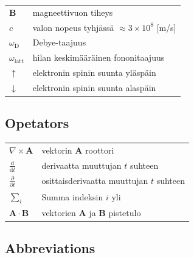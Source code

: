 \documentclass[english,12pt,a4paper,pdftex]{article}
\begin{document}
\begin{tabular}{ll}
$\mathbf{B}$  & magneettivuon tiheys  \\
$c$              & valon nopeus tyhjässä $\approx 3\times10^8$ [m/s]\\
$\omega_{\mathrm{D}}$    & Debye-taajuus \\
$\omega_{\mathrm{latt}}$ & hilan keskimääräinen fononitaajuus \\
$\uparrow$       & elektronin spinin suunta yläspäin\\
$\downarrow$     & elektronin spinin suunta alaspäin
\end{tabular}

\subsection*{Opetators}

\begin{tabular}{ll}
$\nabla \times \mathbf{A}$              & vektorin $\mathbf{A}$ roottori\\
$\displaystyle\frac{\mbox{d}}{\mbox{d} t}$ & derivaatta muuttujan $t$ suhteen\\
[3mm]
$\displaystyle\frac{\partial}{\partial t}$  & osittaisderivaatta muuttujan $t$ suhteen \\[3mm]
$\sum_i $                       & Summa indeksin $i$ yli\\
$\mathbf{A} \cdot \mathbf{B}$    & vektorien $\mathbf{A}$ ja $\mathbf{B}$ pistetulo
\end{tabular}

\subsection*{Abbreviations}
\end{document}
